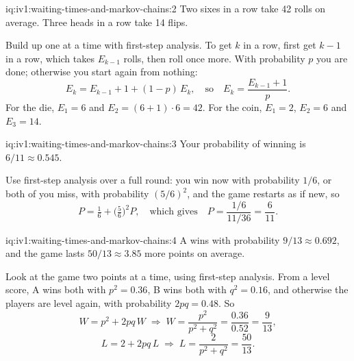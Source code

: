 \begin{solution}{iq:iv1:waiting-times-and-markov-chains:2}
Two sixes in a row take 42 rolls on average. Three heads in a row take 14 flips.

Build up one at a time with first-step analysis. To get $k$ in a row, first get $k - 1$ in a row, which takes $E_{k-1}$ rolls, then roll once more. With probability $p$ you are done; otherwise you start again from nothing:
\[
E_k = E_{k-1} + 1 + (1 - p)\,E_k, \quad\text{so}\quad E_k = \frac{E_{k-1} + 1}{p}.
\]
For the die, $E_1 = 6$ and $E_2 = (6 + 1) \cdot 6 = 42$. For the coin, $E_1 = 2$, $E_2 = 6$ and $E_3 = 14$.

\end{solution}

\begin{solution}{iq:iv1:waiting-times-and-markov-chains:3}
Your probability of winning is $6/11 \approx 0.545$.

Use first-step analysis over a full round: you win now with probability $1/6$, or both of you miss, with probability $(5/6)^2$, and the game restarts as if new, so
\[
P = \tfrac16 + \bigl(\tfrac56\bigr)^2 P, \quad\text{which gives}\quad P = \frac{1/6}{11/36} = \frac{6}{11}.
\]
\end{solution}

\enlargethispage{-3\baselineskip}%
\begin{solution}{iq:iv1:waiting-times-and-markov-chains:4}
A wins with probability $9/13 \approx 0.692$, and the game lasts $50/13 \approx 3.85$ more points on average.

Look at the game two points at a time, using first-step analysis. From a level score, A wins both with $p^2 = 0.36$, B wins both with $q^2 = 0.16$, and otherwise the players are level again, with probability $2pq = 0.48$. So
\[
W = p^2 + 2pq\,W \;\Rightarrow\; W = \frac{p^2}{p^2 + q^2} = \frac{0.36}{0.52} = \frac{9}{13},
\]
\[
L = 2 + 2pq\,L \;\Rightarrow\; L = \frac{2}{p^2 + q^2} = \frac{50}{13}.
\]
\end{solution}

